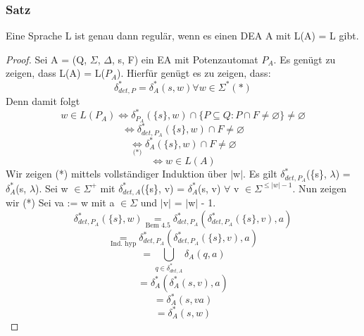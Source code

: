     \subsubsection*{Satz}
        Eine Sprache L ist genau dann regulär, wenn es einen DEA A mit L(A) = L gibt.\par\bigskip
        \begin{proof}
            Sei A = (Q, $\Sigma$, $\Delta$, s, F) ein EA mit Potenzautomat $P_{A}$. Es genügt zu zeigen, dass L(A) = L($P_{A}$). Hierfür genügt es zu zeigen, dass:
\[\delta_{det,P}^{*} = \delta_{A}^{*}(s, w) \forall w \in \Sigma^{*} (*)\]
Denn damit folgt
\[w \in  L (P_{A}) \Leftrightarrow \delta_{P_{A}}^{*}(\{s\}, w) \cap \{P\subseteq Q : P\cap F \neq \varnothing \} \neq \varnothing \] 
\[\Leftrightarrow \delta_{det, P_{A}}^{*}(\{s\}, w) \cap F \neq \varnothing \]
\[\underset{\text{(*)}}{\Leftrightarrow } \delta_{A}^{*}(\{s\}, w) \cap F \neq \varnothing \]
\[\Leftrightarrow w \in L(A)\] Wir zeigen (*) mittels vollständiger Induktion über $\lvert$w$\rvert$. Es gilt $\delta_{det, P_{A}}^{*}$(\{s\}, $\lambda$) = $\delta_{A}^{*}$(s, $\lambda$). Sei w $\in \Sigma^{+}$ mit $\delta_{det, A}^{*}$(\{s\}, v) = $\delta_{A}^{*}$(s, v) $\forall$ v $\in \Sigma^{\leq \lvert w \rvert - 1}$. Nun zeigen wir (*) Sei va := w mit a $\in \Sigma$ und $\lvert$v$\rvert$ = $\lvert$w$\rvert$ - 1.
\[\delta_{det, P_{A}}^{*} (\{s\}, w) \underset{\text{Bem 4.5}}{=} \delta_{det, P_{A}}^{*} (\delta_{det, P_{A}}^{*}(\{s\}, v), a)\]
\[\underset{\text{Ind. hyp}}{=} \delta_{det, P_{A}}^{*}(\delta_{det, P_{A}}^{*}(\{s\}, v), a)\]
\[ = \bigcup \limits_{q \in \delta_{det, A}^{*}}\delta_{A}(q, a)\]
\[ = \delta_{A}^{*}(\delta_{A}^{*}(s, v), a)\]
\[ = \delta_{A}^{*}(s, va)\]
\[ = \delta_{A}^{*}(s, w)\]
        \end{proof}